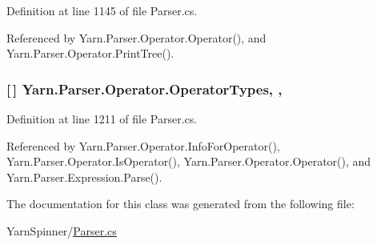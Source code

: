 Definition at line 1145 of file Parser.\-cs.



Referenced by Yarn.\-Parser.\-Operator.\-Operator(), and Yarn.\-Parser.\-Operator.\-Print\-Tree().

\hypertarget{a00133_ad8a4bb1b46dbc3d1b7708e78a2d97e1c}{
\subsubsection[{Operator\-Types}]{ \mbox{[}$\,$\mbox{]} Yarn.\-Parser.\-Operator.\-Operator\-Types\hspace{0.3cm}{\ttfamily [static]}, {\ttfamily [get]}, {\ttfamily [package]}}}\label{a00133_ad8a4bb1b46dbc3d1b7708e78a2d97e1c}


Definition at line 1211 of file Parser.\-cs.



Referenced by Yarn.\-Parser.\-Operator.\-Info\-For\-Operator(), Yarn.\-Parser.\-Operator.\-Is\-Operator(), Yarn.\-Parser.\-Operator.\-Operator(), and Yarn.\-Parser.\-Expression.\-Parse().



The documentation for this class was generated from the following file\-:\begin{DoxyCompactItemize}
\item 
Yarn\-Spinner/\hyperlink{a00295}{Parser.\-cs}\end{DoxyCompactItemize}
